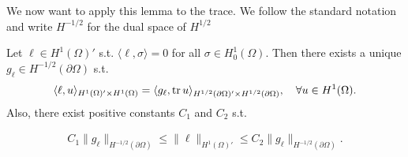 \documentclass[../master_thesis.tex]{subfiles}
\begin{document}
We now want to apply this lemma to the trace. 
We follow the standard notation and write $H^{-1/2}$ for the dual space of 
$H^{1/2}$
\begin{proposition}\label{prop:existence_gl_in_H12}
    Let $\ell \in H^1(\Omega)'$ s.t. $\langle \ell, \sigma \rangle = 0$
    for all $\sigma \in H^1_0(\Omega)$. Then there exists a unique
    $g_\ell \in H^{-1/2}(\partial \Omega)$ s.t.
    \begin{align}
        \langle \ell, u \rangle_{H^1(\Omega)' \times H^1(\Omega)} 
        = \langle g_\ell, \operatorname{tr} u \rangle_{H^{1/2}(\partial \Omega)' \times H^{1/2}(\partial \Omega)}, 
            \quad \forall u \in H^1(\Omega). \label{eq:functional_as_trace_inner_product}
    \end{align}
    Also, there exist positive constants $C_1$ and $C_2$ s.t.
    
    \begin{align*}
        C_1 \lVert g_\ell \rVert _{H^{-1/2}(\partial \Omega)} \leq  \lVert \ell \rVert _{H^1(\Omega)'}
        \leq C_2 \lVert g_\ell \rVert _{H^{-1/2}(\partial \Omega)}.            
    \end{align*}
\end{proposition}
\end{document}
